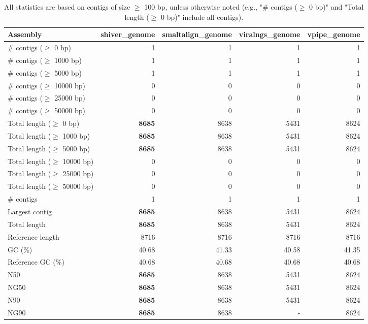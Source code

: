 \documentclass[12pt,a4paper]{article}
\begin{document}
\begin{table}[ht]
\begin{center}
\caption{All statistics are based on contigs of size $\geq$ 100 bp, unless otherwise noted (e.g., "\# contigs ($\geq$ 0 bp)" and "Total length ($\geq$ 0 bp)" include all contigs).}
\begin{tabular}{|l*{4}{|r}|}
\hline
Assembly & shiver\_genome & smaltalign\_genome & viralngs\_genome & vpipe\_genome \\ \hline
\# contigs ($\geq$ 0 bp) & 1 & 1 & 1 & 1 \\ \hline
\# contigs ($\geq$ 1000 bp) & 1 & 1 & 1 & 1 \\ \hline
\# contigs ($\geq$ 5000 bp) & 1 & 1 & 1 & 1 \\ \hline
\# contigs ($\geq$ 10000 bp) & 0 & 0 & 0 & 0 \\ \hline
\# contigs ($\geq$ 25000 bp) & 0 & 0 & 0 & 0 \\ \hline
\# contigs ($\geq$ 50000 bp) & 0 & 0 & 0 & 0 \\ \hline
Total length ($\geq$ 0 bp) & {\bf 8685} & 8638 & 5431 & 8624 \\ \hline
Total length ($\geq$ 1000 bp) & {\bf 8685} & 8638 & 5431 & 8624 \\ \hline
Total length ($\geq$ 5000 bp) & {\bf 8685} & 8638 & 5431 & 8624 \\ \hline
Total length ($\geq$ 10000 bp) & 0 & 0 & 0 & 0 \\ \hline
Total length ($\geq$ 25000 bp) & 0 & 0 & 0 & 0 \\ \hline
Total length ($\geq$ 50000 bp) & 0 & 0 & 0 & 0 \\ \hline
\# contigs & 1 & 1 & 1 & 1 \\ \hline
Largest contig & {\bf 8685} & 8638 & 5431 & 8624 \\ \hline
Total length & {\bf 8685} & 8638 & 5431 & 8624 \\ \hline
Reference length & 8716 & 8716 & 8716 & 8716 \\ \hline
GC (\%) & 40.68 & 41.33 & 40.58 & 41.35 \\ \hline
Reference GC (\%) & 40.68 & 40.68 & 40.68 & 40.68 \\ \hline
N50 & {\bf 8685} & 8638 & 5431 & 8624 \\ \hline
NG50 & {\bf 8685} & 8638 & 5431 & 8624 \\ \hline
N90 & {\bf 8685} & 8638 & 5431 & 8624 \\ \hline
NG90 & {\bf 8685} & 8638 & - & 8624 \\ \hline

\end{tabular}
\end{center}
\end{table}
\end{document}
